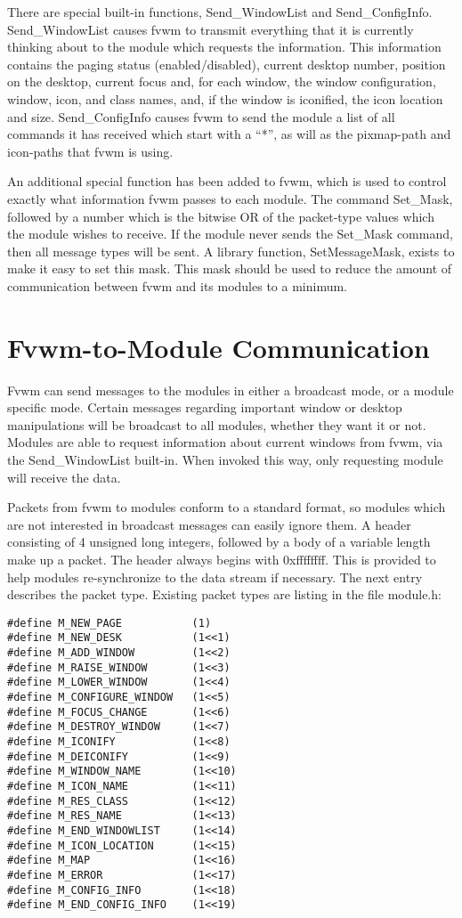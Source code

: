 There are special built-in functions, Send\_WindowList and
Send\_ConfigInfo.
Send\_WindowList causes fvwm to transmit everything that it is
currently thinking about to the module which requests the information.
This information contains the paging status (enabled/disabled),
current desktop number, position on the desktop, current focus and,
for each window, the window configuration, window, icon, and class
names, and, if the window is iconified, the icon location and size.
Send\_ConfigInfo causes fvwm to send the module a list of all
commands it has received which start with a ``*'', as will as the
pixmap-path and icon-paths that fvwm is using.

An additional special function has been added to fvwm, which is used
to control exactly what information fvwm passes to each module. The
command Set\_Mask, followed by a number which is the bitwise OR of the
packet-type values which the module wishes to receive. If the module
never sends the Set\_Mask command, then all message types will be
sent. A library function, SetMessageMask, exists to make it easy to
set this mask. This mask should be used to reduce the amount of
communication between fvwm and its modules to a minimum.

\section{Fvwm-to-Module Communication}
Fvwm
can send messages to the modules in either a broadcast mode, or a
module specific mode. Certain messages regarding important window or
desktop manipulations will be broadcast to all modules, whether they 
want it or not. Modules are able to request information about current windows
from fvwm, via the Send\_WindowList built-in. When invoked this way,
only requesting module will receive the data.

Packets from fvwm to modules conform to a standard format, so modules
which are not interested in broadcast messages can easily ignore them.
A header consisting of 4 unsigned long integers, followed by a body of
a variable length make up a packet. The header always begins with
0xffffffff. This is provided to help modules re-synchronize to the
data stream if necessary. The next entry describes the packet type.
Existing packet types are listing in the file module.h:
\begin{verbatim}
#define M_NEW_PAGE           (1)
#define M_NEW_DESK           (1<<1)
#define M_ADD_WINDOW         (1<<2)
#define M_RAISE_WINDOW       (1<<3)
#define M_LOWER_WINDOW       (1<<4)
#define M_CONFIGURE_WINDOW   (1<<5)
#define M_FOCUS_CHANGE       (1<<6)
#define M_DESTROY_WINDOW     (1<<7)
#define M_ICONIFY            (1<<8)
#define M_DEICONIFY          (1<<9)
#define M_WINDOW_NAME        (1<<10)
#define M_ICON_NAME          (1<<11)
#define M_RES_CLASS          (1<<12)
#define M_RES_NAME           (1<<13)
#define M_END_WINDOWLIST     (1<<14)
#define M_ICON_LOCATION      (1<<15)
#define M_MAP                (1<<16)
#define M_ERROR              (1<<17)
#define M_CONFIG_INFO        (1<<18)
#define M_END_CONFIG_INFO    (1<<19)
\end{verbatim}

